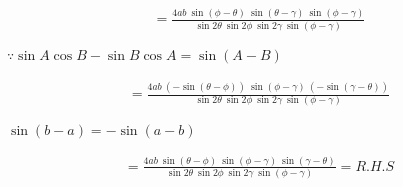 \documentclass[journal,12pt,twocolumn]{IEEEtran}
\begin{document}
\vspace{0.3cm}
\begin{multline*}
    =\frac{4ab~ \sin(\phi-\theta)~\sin(\theta-\gamma)~\sin(\phi-\gamma) }{\sin2\theta~\sin2\phi~\sin2\gamma~\sin(\phi-\gamma)}
\end{multline*}
\begin{flushright}
$\because \sin A\cos B - \sin B\cos A = \sin(A-B)$
\end{flushright}

\vspace{0.3cm}
\begin{multline*}
    =\frac{4ab~(-\sin(\theta-\phi))~\sin(\phi-\gamma)~(-\sin(\gamma-\theta) )}{\sin2\theta~\sin2\phi~\sin2\gamma~\sin(\phi-\gamma)}
\end{multline*}
\begin{flushright}
$\sin (b-a)=-\sin (a-b) $
\end{flushright}

\vspace{0.3cm}
\begin{multline*}
    =\frac{4ab~\sin(\theta-\phi)~\sin(\phi-\gamma)~\sin(\gamma-\theta) }{\sin2\theta~\sin2\phi~\sin2\gamma~\sin(\phi-\gamma)} = R.H.S
\end{multline*}
\end{document}
